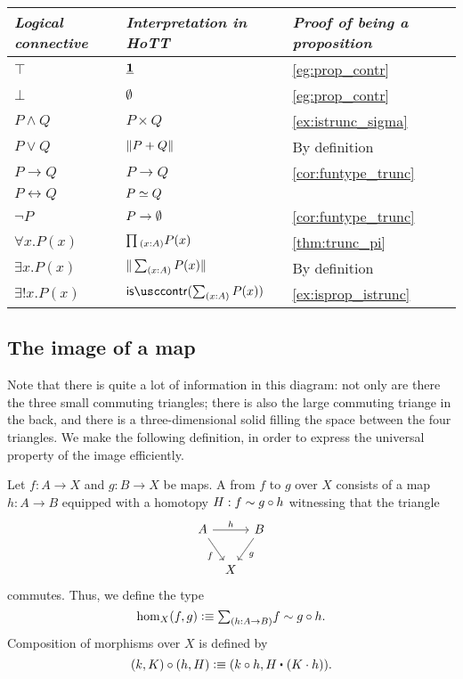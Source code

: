 \begin{center}
\begin{tabular}{lll}
\toprule
\emph{Logical connective} & \emph{Interpretation in HoTT} & \emph{Proof of being a proposition} \\
\midrule
$\top$ & $\underline{\mathbf{1}}$ & \cref{eg:prop_contr} \\
$\bot$ & $\emptyset$ & \cref{eg:prop_contr}\\
$P\land Q$ & $P\times Q$ & \cref{ex:istrunc_sigma} \\
$P\lor Q$ & $\Vert P+Q\Vert_{}$ & By definition \\
$P\to Q$ & $P\to Q$ & \cref{cor:funtype_trunc} \\
$P\leftrightarrow Q$ & $\eqv{P}{Q}$ \\
$\neg P$ & $P\to\emptyset$ & \cref{cor:funtype_trunc} \\
$\forall x.P(x)$ & $\prd{x:A}P(x)$ & \cref{thm:trunc_pi} \\
$\exists x.P(x)$ & $\brck{\sm{x:A}P(x)}$ & By definition \\
$\exists! x.P(x)$ & $\iscontr(\sm{x:A}P(x))$ & \cref{ex:isprop_istrunc} \\
\bottomrule
\end{tabular}
\end{center}

\subsection{The image of a map}\label{sec:image-construction}
 Note that there is quite a lot of information in this diagram: not only are there the three small commuting triangles; there is also the large commuting triange in the back, and there is a three-dimensional solid filling the space between the four triangles. We make the following definition, in order to express the universal property of the image efficiently.

\begin{defn}
  Let $f:A\to X$ and $g:B\to X$ be maps. A  from $f$ to $g$ over $X$ consists of a map $h:A\to B$ equipped with a homotopy $H:f\sim g\circ h$ witnessing that the triangle
\begin{equation*}
\begin{tikzcd}[column sep=tiny]
A \arrow[rr,"h"] \arrow[dr,swap,"f"] & & B \arrow[dl,"g"] \\
& X
\end{tikzcd}
\end{equation*}
commutes. Thus, we define the type
\begin{equation*}
\mathrm{hom}_X(f,g)\defeq\sm{h:A\to B}f\htpy g\circ h.
\end{equation*}
Composition of morphisms over $X$ is defined by
\begin{equation*}
  (k,K)\circ (h,H) \defeq (k\circ h,\ct{H}{(K\cdot h)}).
\end{equation*}
\end{defn}

